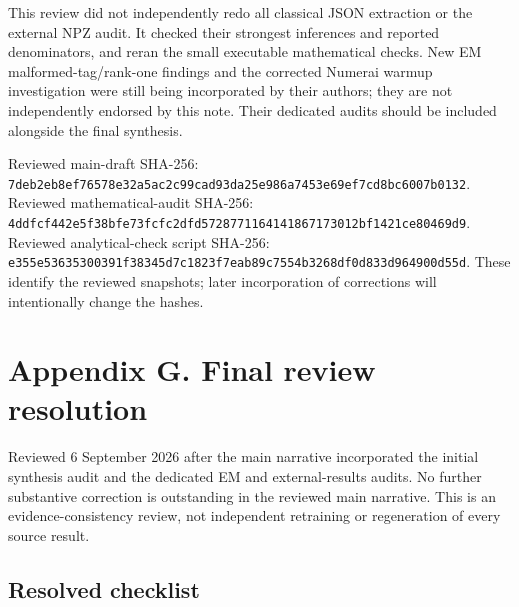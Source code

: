 \documentclass[
  british,
  10pt,
  a4paper,
]{article}
\begin{document}
This review did not independently redo all classical JSON extraction or
the external NPZ audit. It checked their strongest inferences and
reported denominators\allowbreak{},\allowbreak{} and reran the small
executable mathematical checks. New EM
malformed-\allowbreak{}tag/\allowbreak{}rank-\allowbreak{}one findings
and the corrected Numerai warmup investigation were still being
incorporated by their authors; they are not independently endorsed by
this note. Their dedicated audits should be included alongside the final
synthesis.

Reviewed main-draft SHA-256:
\texttt{7deb2eb8ef76\allowbreak{}578e32a5ac2c\allowbreak{}99cad93da25e\allowbreak{}986a7453e69e\allowbreak{}f7cd8bc6007b\allowbreak{}0132}.
Reviewed mathematical\allowbreak{}-\allowbreak{}audit SHA-256:
\texttt{4ddfcf442e5f\allowbreak{}38bfe73fcfc2\allowbreak{}dfd572877116\allowbreak{}414186717301\allowbreak{}2bf1421ce804\allowbreak{}69d9}.
Reviewed analytical-\allowbreak{}check script SHA-256:
\texttt{e355e5363530\allowbreak{}0391f38345d7\allowbreak{}c1823f7eab89\allowbreak{}c7554b3268df\allowbreak{}0d833d964900\allowbreak{}d55d}.
These identify the reviewed snapshots; later incorporation of
corrections will intentionally change the hashes.

\clearpage

\section{Appendix G. Final review resolution}\label{final-resolution}

Reviewed 6 September 2026 after the main narrative incorporated the
initial synthesis audit and the dedicated EM and
external-\allowbreak{}results audits. No further substantive correction
is outstanding in the reviewed main narrative. This is an
evidence-\allowbreak{}consistency review, not independent retraining or
regeneration of every source result.

\subsection{Resolved
checklist}\label{final-resolution--resolved-checklist}
\end{document}
